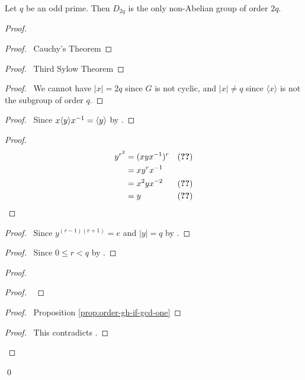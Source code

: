 \begin{prop}
Let $q$ be an odd prime. Then $D_{2q}$ is the only non-Abelian group of order $2q$.
\end{prop}

\begin{proof}
\pf
{}
\begin{proof}
	\pf\ Cauchy's Theorem
\end{proof}
\begin{proof}
	\pf\ Third Sylow Theorem
\end{proof}
\begin{proof}
	\pf\ We cannot have $|x| = 2q$ since $G$ is not cyclic, and $|x| \neq q$ since $\langle x \rangle$ is not the subgroup of order $q$.
\end{proof}
\begin{proof}
	\pf\ Since $x \langle y \rangle {x}^{-1} = \langle y \rangle$ by .
\end{proof}
\begin{proof}
	\pf
	\begin{align*}
		y^{r^2} & = (xy \inv{x})^r & (\text{\stepref{6}}) \\
		& = x y^r \inv{x} \\
		& = x^2 y x^{-2} & (\text{\stepref{6}}) \\
		& = y & (\text{\stepref{4.5}})
	\end{align*}
\end{proof}
\begin{proof}
	\pf\ Since $y^{(r-1)(r+1)} = e$ and $|y| = q$ by .
\end{proof}
\begin{proof}
	\pf\ Since $0 \leq r < q$ by .
\end{proof}
\begin{proof}
	\begin{proof}
		\pf\ 
	\end{proof}
	\begin{proof}
		\pf\ Proposition \ref{prop:order-gh-if-gcd-one}
	\end{proof}
	\qedstep
	\begin{proof}
		\pf\ This contradicts .
	\end{proof}
\end{proof}
\qed
\end{proof}

